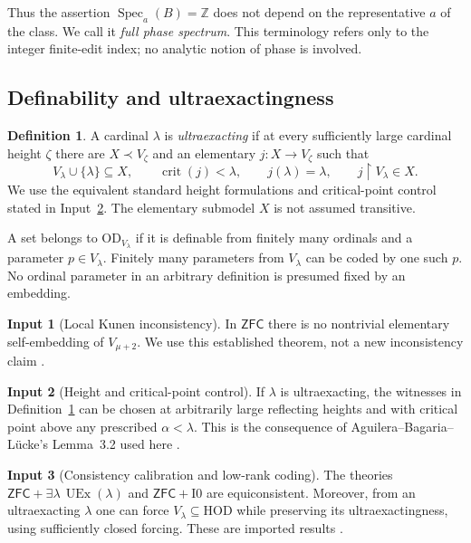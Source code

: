 \documentclass[11pt,letterpaper]{article}
\theoremstyle{definition}
\newtheorem{definition}{Definition}[section]
\newcommand{\ZFC}{\mathsf{ZFC}}
\newcommand{\HOD}{\mathrm{HOD}}
\newcommand{\OD}{\mathrm{OD}}
\newcommand{\UEx}{\operatorname{UEx}}
\newcommand{\crit}{\operatorname{crit}}
\newcommand{\restr}{\mathbin{\upharpoonright}}
\newcommand{\Izero}{\mathrm{I0}}
\newtheorem{inputthm}{Input}
\numberwithin{equation}{section}
\newcommand{\ZZ}{\mathbb Z}
\newcommand{\Spec}{\operatorname{Spec}}
\begin{document}
Thus the assertion $\Spec_a(B)=\ZZ$ does not depend on the representative $a$ of the class. We call it \emph{full phase spectrum}. This terminology refers only to the integer finite-edit index; no analytic notion of phase is involved.

\subsection{Definability and ultraexactingness}

\begin{definition}\label{def:uex}
A cardinal $\lambda$ is \emph{ultraexacting} if at every sufficiently large cardinal height $\zeta$ there are $X\prec V_\zeta$ and an elementary $j:X\to V_\zeta$ such that
\[
V_\lambda\cup\{\lambda\}\subseteq X,\qquad
\crit(j)<\lambda,\qquad j(\lambda)=\lambda,\qquad
j\restr V_\lambda\in X.
\]
We use the equivalent standard height formulations and critical-point control stated in Input~\ref{in:control}. The elementary submodel $X$ is not assumed transitive.

A set belongs to $\OD_{V_\lambda}$ if it is definable from finitely many ordinals and a parameter $p\in V_\lambda$. Finitely many parameters from $V_\lambda$ can be coded by one such $p$. No ordinal parameter in an arbitrary definition is presumed fixed by an embedding.
\end{definition}

\begin{inputthm}[Local Kunen inconsistency]\label{in:kunen}
In $\ZFC$ there is no nontrivial elementary self-embedding of $V_{\mu+2}$. We use this established theorem, not a new inconsistency claim \cite{kunen,hkp}.
\end{inputthm}

\begin{inputthm}[Height and critical-point control]\label{in:control}
If $\lambda$ is ultraexacting, the witnesses in Definition~\ref{def:uex} can be chosen at arbitrarily large reflecting heights and with critical point above any prescribed $\alpha<\lambda$. This is the consequence of Aguilera--Bagaria--L\"ucke's Lemma~3.2 used here \cite[Lemma~3.2]{abl}.
\end{inputthm}

\begin{inputthm}[Consistency calibration and low-rank coding]\label{in:calibration}
The theories $\ZFC+\exists\lambda\,\UEx(\lambda)$ and $\ZFC+\Izero$ are equiconsistent. Moreover, from an ultraexacting $\lambda$ one can force $V_\lambda\subseteq\HOD$ while preserving its ultraexactingness, using sufficiently closed forcing. These are imported results \cite[Theorem~4.5 and Proposition~3.9]{abgl}.
\end{inputthm}
\end{document}
